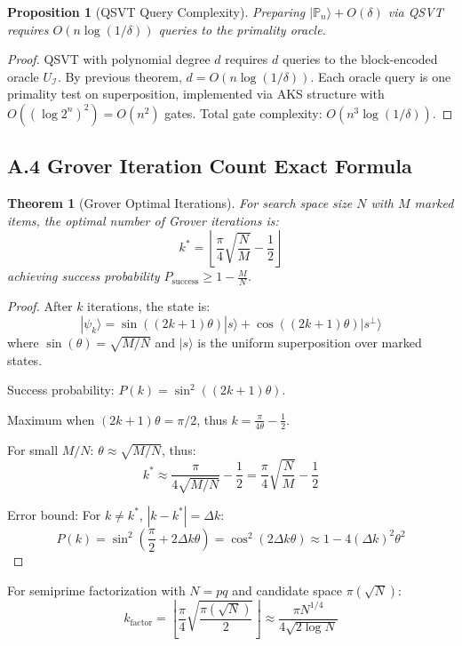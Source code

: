 \documentclass[11pt,letterpaper]{article}
\newtheorem{theorem}{Theorem}
\newtheorem{proposition}{Proposition}
\begin{document}
\begin{proposition}[QSVT Query Complexity]
Preparing $|\mathbb{P}_n\rangle + O(\delta)$ via QSVT requires $O(n\log(1/\delta))$ queries to the primality oracle.
\end{proposition}

\begin{proof}
QSVT with polynomial degree $d$ requires $d$ queries to the block-encoded oracle $U_{\mathcal{I}}$. By previous theorem, $d = O(n\log(1/\delta))$. Each oracle query is one primality test on superposition, implemented via AKS structure with $O((\log 2^n)^2) = O(n^2)$ gates. Total gate complexity: $O(n^3\log(1/\delta))$.
\end{proof}

\subsection{A.4 Grover Iteration Count Exact Formula}

\begin{theorem}[Grover Optimal Iterations]
For search space size $N$ with $M$ marked items, the optimal number of Grover iterations is:
\[
k^* = \left\lfloor \frac{\pi}{4}\sqrt{\frac{N}{M}} - \frac{1}{2} \right\rfloor
\]
achieving success probability $P_{\text{success}} \geq 1 - \frac{M}{N}$.
\end{theorem}

\begin{proof}
After $k$ iterations, the state is:
\[
|\psi_k\rangle = \sin((2k+1)\theta)|s\rangle + \cos((2k+1)\theta)|s^\perp\rangle
\]
where $\sin(\theta) = \sqrt{M/N}$ and $|s\rangle$ is the uniform superposition over marked states.

Success probability: $P(k) = \sin^2((2k+1)\theta)$.

Maximum when $(2k+1)\theta = \pi/2$, thus $k = \frac{\pi}{4\theta} - \frac{1}{2}$.

For small $M/N$: $\theta \approx \sqrt{M/N}$, thus:
\[
k^* \approx \frac{\pi}{4\sqrt{M/N}} - \frac{1}{2} = \frac{\pi}{4}\sqrt{\frac{N}{M}} - \frac{1}{2}
\]

Error bound: For $k \neq k^*$, $|k - k^*| = \Delta k$:
\[
P(k) = \sin^2\left(\frac{\pi}{2} + 2\Delta k \theta\right) = \cos^2(2\Delta k \theta) \approx 1 - 4(\Delta k)^2 \theta^2
\]
\end{proof}

\begin{corollary}
For semiprime factorization with $N = pq$ and candidate space $\pi(\sqrt{N})$:
\[
k_{\text{factor}} = \left\lfloor \frac{\pi}{4}\sqrt{\frac{\pi(\sqrt{N})}{2}} \right\rfloor \approx \frac{\pi N^{1/4}}{4\sqrt{2\log N}}
\]
\end{corollary}
\end{document}
